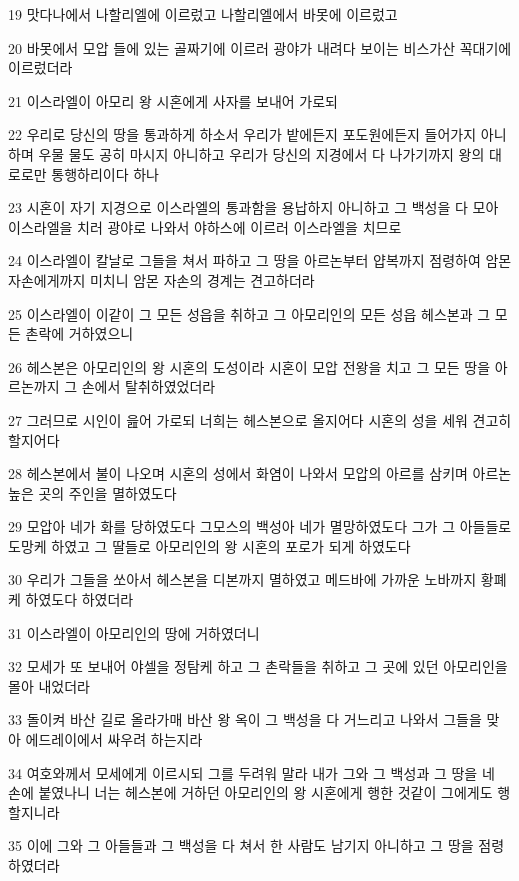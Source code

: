 \par 19 맛다나에서 나할리엘에 이르렀고 나할리엘에서 바못에 이르렀고
\par 20 바못에서 모압 들에 있는 골짜기에 이르러 광야가 내려다 보이는 비스가산 꼭대기에 이르렀더라
\par 21 이스라엘이 아모리 왕 시혼에게 사자를 보내어 가로되
\par 22 우리로 당신의 땅을 통과하게 하소서 우리가 밭에든지 포도원에든지 들어가지 아니하며 우물 물도 공히 마시지 아니하고 우리가 당신의 지경에서 다 나가기까지 왕의 대로로만 통행하리이다 하나
\par 23 시혼이 자기 지경으로 이스라엘의 통과함을 용납하지 아니하고 그 백성을 다 모아 이스라엘을 치러 광야로 나와서 야하스에 이르러 이스라엘을 치므로
\par 24 이스라엘이 칼날로 그들을 쳐서 파하고 그 땅을 아르논부터 얍복까지 점령하여 암몬 자손에게까지 미치니 암몬 자손의 경계는 견고하더라
\par 25 이스라엘이 이같이 그 모든 성읍을 취하고 그 아모리인의 모든 성읍 헤스본과 그 모든 촌락에 거하였으니
\par 26 헤스본은 아모리인의 왕 시혼의 도성이라 시혼이 모압 전왕을 치고 그 모든 땅을 아르논까지 그 손에서 탈취하였었더라
\par 27 그러므로 시인이 읊어 가로되 너희는 헤스본으로 올지어다 시혼의 성을 세워 견고히 할지어다
\par 28 헤스본에서 불이 나오며 시혼의 성에서 화염이 나와서 모압의 아르를 삼키며 아르논 높은 곳의 주인을 멸하였도다
\par 29 모압아 네가 화를 당하였도다 그모스의 백성아 네가 멸망하였도다 그가 그 아들들로 도망케 하였고 그 딸들로 아모리인의 왕 시혼의 포로가 되게 하였도다
\par 30 우리가 그들을 쏘아서 헤스본을 디본까지 멸하였고 메드바에 가까운 노바까지 황폐케 하였도다 하였더라
\par 31 이스라엘이 아모리인의 땅에 거하였더니
\par 32 모세가 또 보내어 야셀을 정탐케 하고 그 촌락들을 취하고 그 곳에 있던 아모리인을 몰아 내었더라
\par 33 돌이켜 바산 길로 올라가매 바산 왕 옥이 그 백성을 다 거느리고 나와서 그들을 맞아 에드레이에서 싸우려 하는지라
\par 34 여호와께서 모세에게 이르시되 그를 두려워 말라 내가 그와 그 백성과 그 땅을 네 손에 붙였나니 너는 헤스본에 거하던 아모리인의 왕 시혼에게 행한 것같이 그에게도 행할지니라
\par 35 이에 그와 그 아들들과 그 백성을 다 쳐서 한 사람도 남기지 아니하고 그 땅을 점령하였더라


